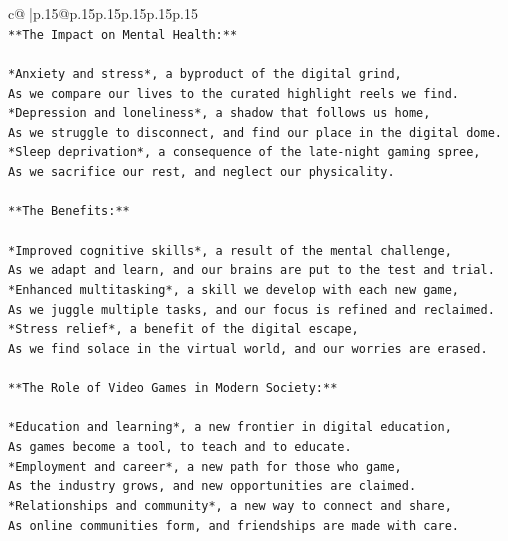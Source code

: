 \documentclass{article}
\begin{document}
{\begin{supertabular}{c@{$\;$}|p{.15\linewidth}@{}p{.15\linewidth}p{.15\linewidth}p{.15\linewidth}p{.15\linewidth}p{.15\linewidth}}
{{{\\ 
\texttt{**The Impact on Mental Health:**} \\
\\ 
\texttt{*Anxiety and stress*, a byproduct of the digital grind,} \\
\texttt{As we compare our lives to the curated highlight reels we find.} \\
\texttt{*Depression and loneliness*, a shadow that follows us home,} \\
\texttt{As we struggle to disconnect, and find our place in the digital dome.} \\
\texttt{*Sleep deprivation*, a consequence of the late{-}night gaming spree,} \\
\texttt{As we sacrifice our rest, and neglect our physicality.} \\
\\ 
\texttt{**The Benefits:**} \\
\\ 
\texttt{*Improved cognitive skills*, a result of the mental challenge,} \\
\texttt{As we adapt and learn, and our brains are put to the test and trial.} \\
\texttt{*Enhanced multitasking*, a skill we develop with each new game,} \\
\texttt{As we juggle multiple tasks, and our focus is refined and reclaimed.} \\
\texttt{*Stress relief*, a benefit of the digital escape,} \\
\texttt{As we find solace in the virtual world, and our worries are erased.} \\
\\ 
\texttt{**The Role of Video Games in Modern Society:**} \\
\\ 
\texttt{*Education and learning*, a new frontier in digital education,} \\
\texttt{As games become a tool, to teach and to educate.} \\
\texttt{*Employment and career*, a new path for those who game,} \\
\texttt{As the industry grows, and new opportunities are claimed.} \\
\texttt{*Relationships and community*, a new way to connect and share,} \\
\texttt{As online communities form, and friendships are made with care.} \\
\\ 
}}}
\end{supertabular}}
\end{document}
